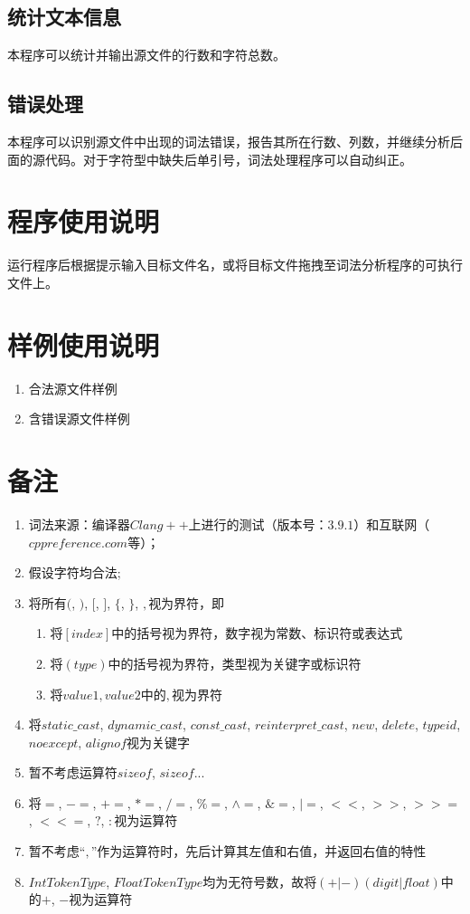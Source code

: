 \documentclass[UTF8]{ctexart}
\begin{document}
\subsection{统计文本信息}
本程序可以统计并输出源文件的行数和字符总数。
\subsection{错误处理}
本程序可以识别源文件中出现的词法错误，报告其所在行数、列数，并继续分析后面的源代码。对于字符型中缺失后单引号，词法处理程序可以自动纠正。
\section{程序使用说明}
运行程序后根据提示输入目标文件名，或将目标文件拖拽至词法分析程序的可执行文件上。
\section{样例使用说明}
\begin{enumerate}
	\item 合法源文件样例
	\item 含错误源文件样例
\end{enumerate}
\section{备注}
\begin{enumerate}
	\item 词法来源：编译器$Clang++$上进行的测试（版本号：$3.9.1$）和互联网（$cppreference.com$等）；
	\item 假设字符均合法;
	\item 将所有$($, $)$, $[$, $]$, $\{$, $\}$, $,$视为界符，即
	      \begin{enumerate}
		      \item 将$[index]$中的括号视为界符，数字视为常数、标识符或表达式
		      \item 将$(type)$中的括号视为界符，类型视为关键字或标识符
		      \item 将${value1, value2}$中的$,$视为界符
	      \end{enumerate}
	\item 将$static\_cast$, $dynamic\_cast$, $const\_cast$, $reinterpret\_cast$, $new$, $delete$, $typeid$, $noexcept$, $alignof$视为关键字
	\item 暂不考虑运算符$sizeof$, $sizeof...$
	\item 将$=$, $-=$, $+=$, $*=$, $/=$, $\%=$, $\wedge=$, $\&=$, $|=$, $<<$, $>>$, $>>=$, $<<=$, $?$, $:$视为运算符
	\item 暂不考虑``$,$''作为运算符时，先后计算其左值和右值，并返回右值的特性
	\item $IntTokenType$, $FloatTokenType$均为无符号数，故将$(+|-)(digit|float)$中的$+$, $-$视为运算符
\end{enumerate}
\end{document}
